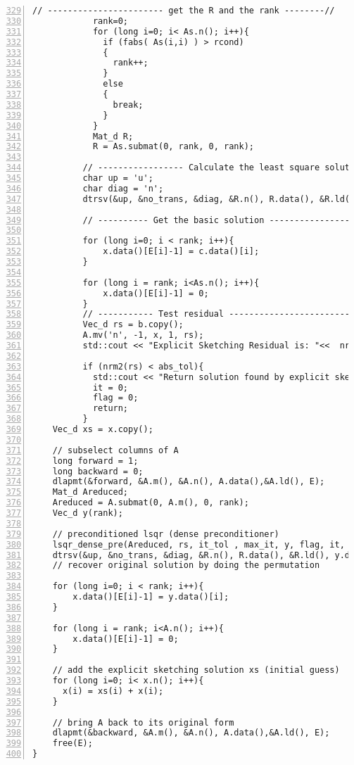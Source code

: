 \documentclass[english,11pt]{article}
\begin{document}
\begin{lstlisting}[numbers=left, firstnumber=329]
          // ----------------------- get the R and the rank --------//
            rank=0;
            for (long i=0; i< As.n(); i++){
              if (fabs( As(i,i) ) > rcond)
              {
                rank++;
              }
              else
              {
                break;
              }
            }
            Mat_d R;
            R = As.submat(0, rank, 0, rank);  

          // ----------------- Calculate the least square solution by back substitution ---------//
          char up = 'u';
          char diag = 'n';
          dtrsv(&up, &no_trans, &diag, &R.n(), R.data(), &R.ld(), c.data(), &c.inc());  

          // ---------- Get the basic solution ---------------------------- //

          for (long i=0; i < rank; i++){
              x.data()[E[i]-1] = c.data()[i]; 
          }

          for (long i = rank; i<As.n(); i++){
              x.data()[E[i]-1] = 0;
          }  
          // ----------- Test residual ----------------------------- //
          Vec_d rs = b.copy();
          A.mv('n', -1, x, 1, rs);
          std::cout << "Explicit Sketching Residual is: "<<  nrm2(rs) << std::endl;

          if (nrm2(rs) < abs_tol){
            std::cout << "Return solution found by explicit sketching with residual: "<< nrm2(rs) << std::endl;
            it = 0;
            flag = 0;
            return;
          }
    Vec_d xs = x.copy();

    // subselect columns of A
    long forward = 1;
    long backward = 0;
    dlapmt(&forward, &A.m(), &A.n(), A.data(),&A.ld(), E);
    Mat_d Areduced;
    Areduced = A.submat(0, A.m(), 0, rank);
    Vec_d y(rank);

    // preconditioned lsqr (dense preconditioner)
    lsqr_dense_pre(Areduced, rs, it_tol , max_it, y, flag, it, R, debug);
    dtrsv(&up, &no_trans, &diag, &R.n(), R.data(), &R.ld(), y.data(), &y.inc());
    // recover original solution by doing the permutation

    for (long i=0; i < rank; i++){
        x.data()[E[i]-1] = y.data()[i]; 
    }

    for (long i = rank; i<A.n(); i++){
        x.data()[E[i]-1] = 0;
    }

    // add the explicit sketching solution xs (initial guess)
    for (long i=0; i< x.n(); i++){
      x(i) = xs(i) + x(i); 
    }

    // bring A back to its original form
    dlapmt(&backward, &A.m(), &A.n(), A.data(),&A.ld(), E);
    free(E);
}
\end{lstlisting}
\end{document}
